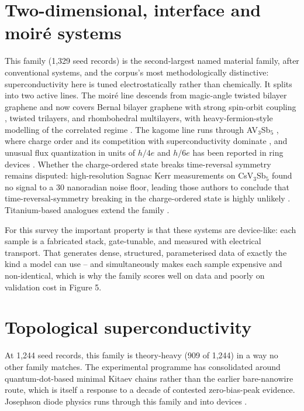 \documentclass[
  11pt,
]{article}
\begin{document}
\section{Two-dimensional, interface and moiré
systems}\label{two-dimensional-interface-and-moiruxe9-systems}

This family (1,329 seed records) is the second-largest named material
family, after conventional systems, and the corpus's most
methodologically distinctive: superconductivity here is tuned
electrostatically rather than chemically. It splits into two active
lines. The moiré line descends from magic-angle twisted bilayer graphene
\citep{cao2018unconventional} and now covers Bernal bilayer graphene
with strong spin-orbit coupling \citep{holleis2023nematicity}, twisted
trilayers, and rhombohedral multilayers, with heavy-fermion-style
modelling of the correlated regime \citep{lau2023topological}. The
kagome line runs through AV\(_3\)Sb\(_5\) \citep{jiang2021kagome}, where
charge order and its competition with superconductivity dominate
\citep{kang2022charge, hu2022coexistence}, and unusual flux quantization
in units of \(h/4e\) and \(h/6e\) has been reported in ring devices
\citep{ge2022charge}. Whether the charge-ordered state breaks
time-reversal symmetry remains disputed: high-resolution Sagnac Kerr
measurements on CsV\(_3\)Sb\(_5\) found no signal to a 30 nanoradian
noise floor, leading those authors to conclude that
time-reversal-symmetry breaking in the charge-ordered state is highly
unlikely \citep{saykin2022high}. Titanium-based analogues extend the
family \citep{yang2022superconductivitya}.

For this survey the important property is that these systems are
device-like: each sample is a fabricated stack, gate-tunable, and
measured with electrical transport. That generates dense, structured,
parameterised data of exactly the kind a model can use -- and
simultaneously makes each sample expensive and non-identical, which is
why the family scores well on data and poorly on validation cost in
Figure 5.

\section{Topological
superconductivity}\label{topological-superconductivity}

At 1,244 seed records, this family is theory-heavy (909 of 1,244) in a
way no other family matches. The experimental programme has consolidated
around quantum-dot-based minimal Kitaev chains
\citep{dvir2022realization, tsintzis2023roadmap, bordin2023crossed}
rather than the earlier bare-nanowire route, which is itself a response
to a decade of contested zero-bias-peak evidence. Josephson diode
physics runs through this family and into devices
\citep{mazur2022gate, lotfizadeh2023superconducting}.
\end{document}
